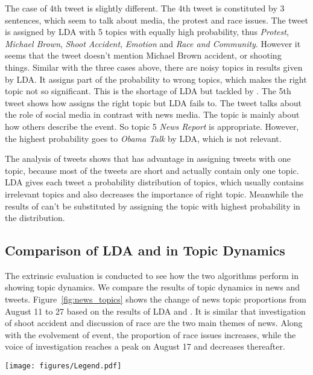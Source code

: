 The case of 4th tweet is slightly different. The 4th tweet is constituted by 3 sentences, which seem to talk about media, the protest and race issues. The tweet is assigned by LDA with 5 topics with equally high probability, thus \emph{Protest}, \emph{Michael Brown}, \emph{Shoot Accident}, \emph{Emotion} and \emph{Race and Community}. However it seems that the tweet doesn't mention Michael Brown accident, or shooting things. Similar with the three cases above, there are noisy topics in results given by LDA. It assigns part of the probability to wrong topics, which makes the right topic not so significant. This is the shortage of LDA but tackled by \stlda.
The 5th tweet shows how \stlda assigns the right topic but LDA fails to. The tweet talks about the role of social media in contrast with news media. The topic is mainly about how others describe the event. So topic 5 \emph{News Report} is appropriate. However, the highest probability goes to \emph{Obama Talk} by LDA, which is not relevant.

The analysis of tweets shows that \stlda has advantage in assigning tweets with one topic, because most of the tweets are short and actually contain only one topic. LDA gives each tweet a probability distribution of topics, which usually contains irrelevant topics and also decreases the importance of right topic. Meanwhile the results of \stlda can't be substituted by assigning the topic with highest probability in the distribution.

\subsection{Comparison of LDA and \stlda in Topic Dynamics}
\label{subsec:extrinsic}

The extrinsic evaluation is conducted to see how the two algorithms perform in showing topic dynamics. We compare the results of topic dynamics in news and tweets. Figure~\ref{fig:news_topics} shows the change of news topic proportions from August 11 to 27 based on the results of LDA and \stlda. It is similar that investigation of shoot accident and discussion of race are the two main themes of news. Along with the evolvement of event, the proportion of race issues increases, while the voice of investigation reaches a peak on August 17 and decreases thereafter.

\begin{figure*}[htpb]
\centering
{}
\texttt{[image: figures/Legend.pdf]}
\caption{News Topic Dynamics by LDA and \stlda}\label{fig:news_topics}
\end{figure*}

